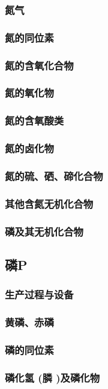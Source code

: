 \documentclass[UTF8]{../03-Chemistry}
\begin{document}
        \subsubsection{氮气}
        \subsubsection{氮的同位素}
        \subsubsection{氮的含氧化合物}
        \subsubsection{氮的氧化物}
        \subsubsection{氮的含氧酸类}
        \subsubsection{氮的卤化物}
        \subsubsection{氮的硫、硒、碲化合物}
        \subsubsection{其他含氮无机化合物}
        \subsubsection{磷及其无机化合物}
    \subsection{磷P}
        \subsubsection{生产过程与设备}
        \subsubsection{黄磷、赤磷}
        \subsubsection{磷的同位素}
        \subsubsection{磷化氢 (膦 )及磷化物}
\end{document}
